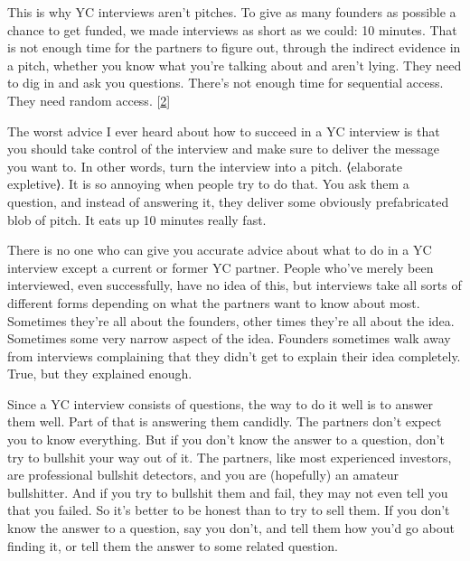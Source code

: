 This is why YC interviews aren't
                  pitches. To give as many founders as possible a chance to get
                  funded, we made interviews as short as we could: 10 minutes.
                  That is not enough time for the partners to figure out,
                  through the indirect evidence in a pitch, whether you know
                  what you're talking about and aren't lying. They need to dig
                  in and ask you questions. There's not enough time for
                  sequential access. They need random access.
                  [\href{\#f2n}{2}]

The worst advice I ever heard about how to
                  succeed in a YC interview is that you should take control of
                  the interview and make sure to deliver the message you want
                  to. In other words, turn the interview into a pitch.
                  ⟨elaborate expletive⟩. It is so annoying when
                  people try to do that. You ask them a question, and instead of
                  answering it, they deliver some obviously prefabricated blob
                  of pitch. It eats up 10 minutes really fast.

There
                  is no one who can give you accurate advice about what to do in
                  a YC interview except a current or former YC partner. People
                  who've merely been interviewed, even successfully, have no
                  idea of this, but interviews take all sorts of different forms
                  depending on what the partners want to know about most.
                  Sometimes they're all about the founders, other times they're
                  all about the idea. Sometimes some very narrow aspect of the
                  idea. Founders sometimes walk away from interviews complaining
                  that they didn't get to explain their idea completely. True,
                  but they explained enough.

Since a YC interview
                  consists of questions, the way to do it well is to answer them
                  well. Part of that is answering them candidly. The partners
                  don't expect you to know everything. But if you don't know the
                  answer to a question, don't try to bullshit your way out of
                  it. The partners, like most experienced investors, are
                  professional bullshit detectors, and you are (hopefully) an
                  amateur bullshitter. And if you try to bullshit them and fail,
                  they may not even tell you that you failed. So it's better to
                  be honest than to try to sell them. If you don't know the
                  answer to a question, say you don't, and tell them how you'd
                  go about finding it, or tell them the answer to some related
                  question.

